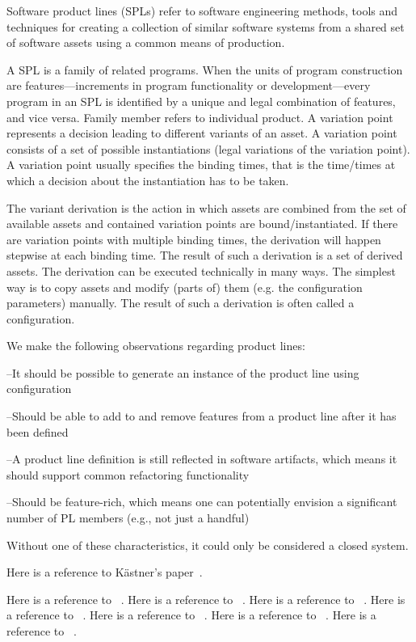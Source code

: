 
Software product lines (SPLs) refer to software engineering methods, tools and
techniques for creating a collection of similar software systems from a shared set of
software assets using a common means of production.

A SPL is a family of related programs. When the units of program construction are features—increments in
program functionality or development—every program in an SPL is identified by a unique and legal
combination of features, and vice versa. Family member refers to individual product. A variation point
represents a decision leading to different variants of an asset. A variation point consists of a set of
possible instantiations (legal variations of the variation point). A variation point usually specifies the
binding times, that is the time/times at which a decision about the instantiation has to be taken.

The variant derivation is the action in which assets are combined from the set of available assets and
contained variation points are bound/instantiated. If there are variation points with multiple binding times,
the derivation will happen stepwise at each binding time. The result of such a derivation is a set of derived
assets. The derivation can be executed technically in many ways. The simplest way is to copy assets and modify
(parts of) them (e.g. the configuration parameters) manually. The result of such a derivation is often called a
configuration.

We make the following observations regarding product lines:

--It should be possible to generate an instance of the product line using configuration

--Should be able to add to and remove features from a product line after it has been defined

--A product line definition is still reflected in software artifacts, which means it should support common refactoring functionality

--Should be feature-rich, which means one can potentially envision a significant number of PL members (e.g., not just a handful)

Without one of these characteristics, it could only be considered a closed system.

Here is a reference to K\"{a}stner's paper~\cite{Kastner:2012}.

Here is a reference to ~\cite{leich2005tool}.
Here is a reference to ~\cite{Thum:2014:FEF:2537169.2537315}.
Here is a reference to ~\cite{proksch2014tool}.
Here is a reference to ~\cite{7203038}.
Here is a reference to ~\cite{Sayre:2005:UMA:1082983.1083277}.
Here is a reference to ~\cite{Setyautami:2016:UPD:2934466.2934479}.
Here is a reference to ~\cite{Sousa:2016:EFM:2934466.2934475}.

